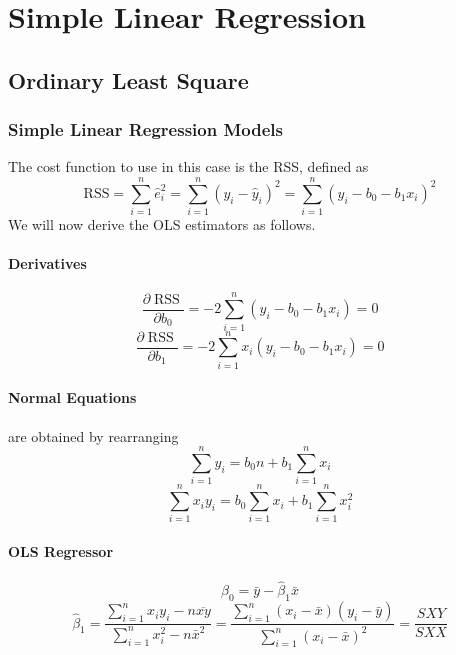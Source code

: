 \documentclass[10pt]{article}
\begin{document}
\section{Simple Linear Regression}
\subsection{Ordinary Least Square}
\subsubsection{Simple Linear Regression Models}
The cost function to use in this case is the RSS, defined as
\begin{equation*}
    \mathrm{RSS}=\sum_{i=1}^{n} \hat{e}_{i}^{2}=\sum_{i=1}^{n}\left(y_{i}-\hat{y}_{i}\right)^{2}=\sum_{i=1}^{n}\left(y_{i}-b_{0}-b_{1} x_{i}\right)^{2}
\end{equation*}
We will now derive the OLS estimators as follows. 
\paragraph{Derivatives}
\begin{equation*}
    \frac{\partial \operatorname{RSS}}{\partial b_{0}}=-2 \sum_{i=1}^{n}\left(y_{i}-b_{0}-b_{1} x_{i}\right)=0
\end{equation*}
\begin{equation*}
    \frac{\partial \operatorname{RSS}}{\partial b_{1}}=-2 \sum_{i=1}^{n} x_{i}\left(y_{i}-b_{0}-b_{1} x_{i}\right)=0
\end{equation*}
\paragraph{Normal Equations} are obtained by rearranging
\begin{equation}
    \sum_{i=1}^{n} y_{i}=b_{0} n+b_{1} \sum_{i=1}^{n} x_{i}
\end{equation}
\begin{equation}
    \sum_{i=1}^{n} x_{i} y_{i}=b_{0} \sum_{i=1}^{n} x_{i}+b_{1} \sum_{i=1}^{n} x_{i}^{2}
\end{equation}
\paragraph{OLS Regressor}
\begin{equation*}
    \hat{\beta}_{0}=\bar{y}-\hat{\beta}_{1} \bar{x}
\end{equation*}
\begin{equation*}
    \hat{\beta}_{1}=\frac{\sum_{i=1}^{n} x_{i} y_{i}-n \overline{x y}}{\sum_{i=1}^{n} x_{i}^{2}-n \bar{x}^{2}}=\frac{\sum_{i=1}^{n}\left(x_{i}-\bar{x}\right)\left(y_{i}-\bar{y}\right)}{\sum_{i=1}^{n}\left(x_{i}-\bar{x}\right)^{2}}=\frac{S X Y}{S X X}
\end{equation*}
\end{document}

